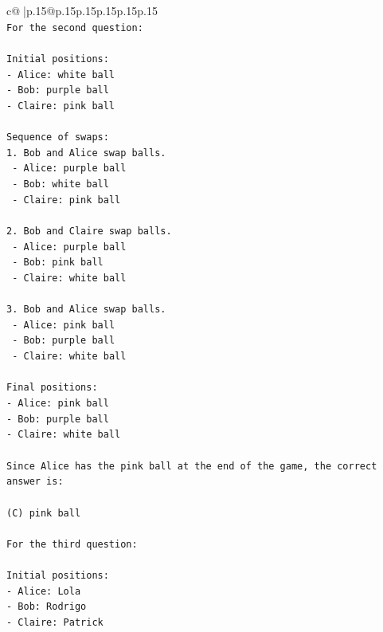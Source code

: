 \documentclass{article}
\begin{document}
{\begin{supertabular}{c@{$\;$}|p{.15\linewidth}@{}p{.15\linewidth}p{.15\linewidth}p{.15\linewidth}p{.15\linewidth}p{.15\linewidth}}
{{{\\ 
\texttt{For the second question:} \\
\\ 
\texttt{Initial positions:} \\
\texttt{{-} Alice: white ball} \\
\texttt{{-} Bob: purple ball} \\
\texttt{{-} Claire: pink ball} \\
\\ 
\texttt{Sequence of swaps:} \\
\texttt{1. Bob and Alice swap balls.} \\
\texttt{   {-} Alice: purple ball} \\
\texttt{   {-} Bob: white ball} \\
\texttt{   {-} Claire: pink ball} \\
\\ 
\texttt{2. Bob and Claire swap balls.} \\
\texttt{   {-} Alice: purple ball} \\
\texttt{   {-} Bob: pink ball} \\
\texttt{   {-} Claire: white ball} \\
\\ 
\texttt{3. Bob and Alice swap balls.} \\
\texttt{   {-} Alice: pink ball} \\
\texttt{   {-} Bob: purple ball} \\
\texttt{   {-} Claire: white ball} \\
\\ 
\texttt{Final positions:} \\
\texttt{{-} Alice: pink ball} \\
\texttt{{-} Bob: purple ball} \\
\texttt{{-} Claire: white ball} \\
\\ 
\texttt{Since Alice has the pink ball at the end of the game, the correct answer is:} \\
\\ 
\texttt{(C) pink ball} \\
\\ 
\texttt{For the third question:} \\
\\ 
\texttt{Initial positions:} \\
\texttt{{-} Alice: Lola} \\
\texttt{{-} Bob: Rodrigo} \\
\texttt{{-} Claire: Patrick} \\
}}}
\end{supertabular}}
\end{document}

